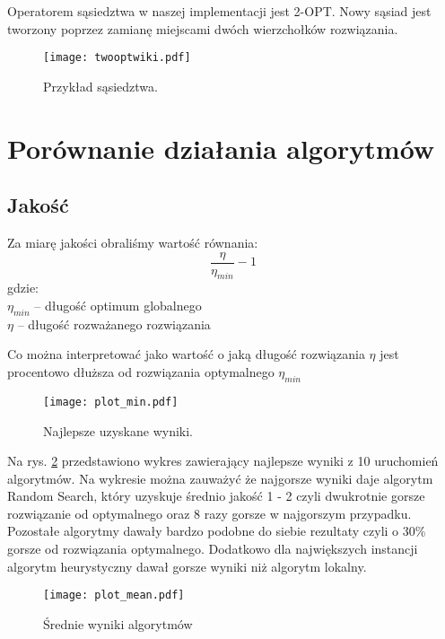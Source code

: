 \documentclass{article}
\begin{document}
Operatorem sąsiedztwa w naszej implementacji jest 2-OPT. Nowy sąsiad jest tworzony poprzez zamianę miejscami dwóch wierzchołków rozwiązania. 

\begin{figure} 
\begin{center}
\texttt{[image: twooptwiki.pdf]}
\end{center}
\caption{Przykład sąsiedztwa.}
\label{fig:schemat2}
\end{figure}


\section{Porównanie działania algorytmów}


\subsection{Jakość}
Za miarę jakości obraliśmy wartość równania:
$$ \frac{\eta}{\eta_{min}}-1 $$
gdzie:\\
$\eta_{min}$ -- długość optimum globalnego \\
$\eta$ -- długość rozważanego rozwiązania

Co można interpretować jako wartość o jaką długość rozwiązania $\eta$ jest procentowo dłuższa od rozwiązania optymalnego $\eta_{min}$

\begin{figure}[H]
\begin{center}
    \texttt{[image: plot\_min.pdf]}
\end{center}
\caption{Najlepsze uzyskane wyniki.}
\label{fig:plot_min}
\end{figure}

Na rys. \ref{fig:plot_min} przedstawiono wykres zawierający najlepsze wyniki z 10 uruchomień algorytmów. Na wykresie można zauważyć że najgorsze wyniki daje algorytm Random Search, który uzyskuje średnio jakość 1 - 2 czyli dwukrotnie gorsze rozwiązanie od optymalnego oraz 8 razy gorsze w najgorszym przypadku. Pozostałe algorytmy dawały bardzo podobne do siebie rezultaty czyli o 30\% gorsze od rozwiązania optymalnego. Dodatkowo dla największych instancji algorytm heurystyczny dawał gorsze wyniki niż algorytm lokalny.

\begin{figure}[H]
\begin{center}
    \texttt{[image: plot\_mean.pdf]}
\end{center}
\caption{Średnie wyniki algorytmów}
\label{fig:plot_avg}
\end{figure}
\end{document}
